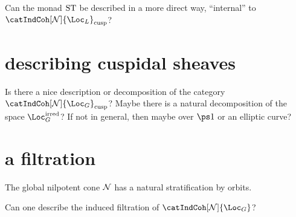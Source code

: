 \documentclass[english]{short-notes}
\begin{document}
\begin{Q}
    Can the monad $\operatorname{ST}$ be described in a more direct way, \enquote{internal} to $\catIndCoh[\globNilp]{\Loc_L}_\cusp$?
\end{Q}

\section{describing cuspidal sheaves}

\begin{Q}
    Is there a nice description or decomposition of the category $\catIndCoh[\globNilp]{\Loc_G}_{\cusp}$?
    Maybe there is a natural decomposition of the space $\Loc_G^\irred$?
    If not in general, then maybe over $\ps 1$ or an elliptic curve?
\end{Q}

\section{a filtration}

The global nilpotent cone $\mathcal{N}$ has a natural stratification by orbits.

\begin{Q}
    Can one describe the induced filtration of $\catIndCoh[\globNilp]{\Loc_G}$?
\end{Q}

\printbibliography
\end{document}
